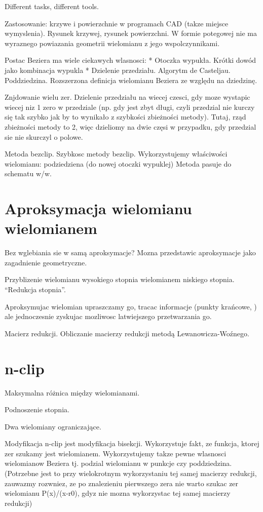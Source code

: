 \documentclass[11pt,a4paper,oneside]{report}
\begin{document}
Different tasks, different tools.

Zastosowanie: krzywe i powierzchnie w programach CAD (takze miejsce wymyslenia). Rysunek krzywej, rysunek powierzchni. W formie potegowej nie ma wyraznego powiazania geometrii wielomianu z jego wspolczynnikami. 

Postac Beziera ma wiele ciekawych wlasnosci:
* Otoczka wypukła. Krótki dowód jako kombinacja wypukla
* Dzielenie przedziału. Algorytm de Casteljau. Poddziedzina. Rozszerzona definicja wielomianu Beziera ze względu na dziedzinę.

Znjdowanie wielu zer. Dzielenie przedziału na wiecej czesci, gdy moze wystapic wiecej niz 1 zero w przedziale (np. gdy jest zbyt długi, czyli przedzial nie kurczy się tak szybko jak by to wynikało z szybkości zbieżności metody). Tutaj, rząd zbieżności metody to 2, więc dzieliomy na dwie częsi w przypadku, gdy przedzial sie nie skurczyl o polowe.

Metoda bezclip. Szybkosc metody bezclip.
Wykorzystujemy właściwości wielomianu: podziedziena (do nowej otoczki wypuklej)
Metoda pasuje do schematu w/w.

\section{Aproksymacja wielomianu wielomianem}

Bez wglebiania sie w samą aproksymacje? Mozna przedstawic aproksymacje jako zagadnienie geometryczne.

Przyblizenie wielomianu wysokiego stopnia wielomianem niskiego stopnia. ``Redukcja stopnia''. 

Aproksymujac wielomian upraszczamy go, tracac informacje (punkty krańcowe, ) ale jednoczesnie zyskujac mozliwosc latwiejszego przetwarzania go.

Macierz redukcji. Obliczanie macierzy redukcji metodą Lewanowicza-Woźnego.

\section{n-clip}

Maksymalna różnica między wielomianami.

Podnoszenie stopnia.

Dwa wielomiany ograniczające.

Modyfikacja n-clip jest modyfikacja bisekcji. Wykorzystuje fakt, ze funkcja, ktorej zer szukamy jest wielomianem. Wykorzystujemy takze pewne wlasnosci wielomianow Beziera tj. podzial wielomianu w punkcje czy poddziedzina. (Potrzebne jest to przy wielokrotnym wykorzystaniu tej samej macierzy redukcji, zauwazmy rozwniez, ze po znalezieniu pierwszego zera nie warto szukac zer wielomianu P(x)/(x-r0), gdyz nie mozna wykorzystac tej samej macierzy redukcji)
\end{document}
